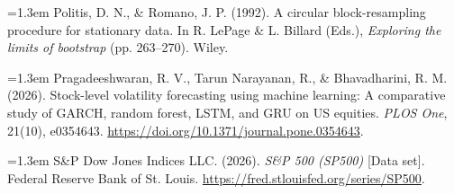 \noindent\hangindent=1.3em Politis, D. N., \& Romano, J. P. (1992). A circular block-resampling procedure for stationary data. In R. LePage \& L. Billard (Eds.), \emph{Exploring the limits of bootstrap} (pp. 263--270). Wiley.

\noindent\hangindent=1.3em Pragadeeshwaran, R. V., Tarun Narayanan, R., \& Bhavadharini, R. M. (2026). Stock-level volatility forecasting using machine learning: A comparative study of GARCH, random forest, LSTM, and GRU on US equities. \emph{PLOS One}, 21(10), e0354643. \url{https://doi.org/10.1371/journal.pone.0354643}.

\noindent\hangindent=1.3em S\&P Dow Jones Indices LLC. (2026). \emph{S\&P 500 (SP500)} [Data set]. Federal Reserve Bank of St. Louis. \url{https://fred.stlouisfed.org/series/SP500}.
\endgroup
